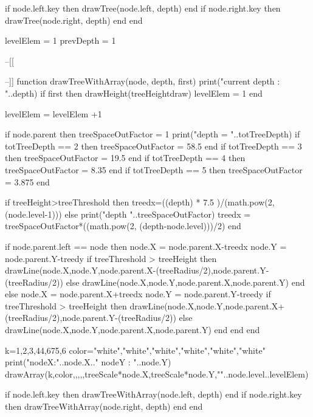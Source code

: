 	if node.left.key then
		drawTree(node.left, depth)
	end
	if node.right.key then
		drawTree(node.right, depth)
	end
end

levelElem = 1
prevDepth = 1

--[[

--]]
function drawTreeWithArray(node, depth, first)
	print("current depth : "..depth)
	if first then 
		drawHeight(treeHeightdraw)
		levelElem = 1
	end

	levelElem = levelElem +1

	if node.parent then
		treeSpaceOutFactor = 1	
		print("depth = "..totTreeDepth)
		if totTreeDepth == 2 then 
			treeSpaceOutFactor = 58.5			
		end
		if totTreeDepth == 3 then 
			treeSpaceOutFactor = 19.5			
		end
		if totTreeDepth == 4 then 
			treeSpaceOutFactor = 8.35			
		end
		if totTreeDepth == 5 then 
			treeSpaceOutFactor = 3.875			
		end

		if treeHeight>treeThreshold then
			treedx=((depth) * 7.5 )/(math.pow(2,(node.level-1)))
		else
			print("depth "..treeSpaceOutFactor)
			treedx = treeSpaceOutFactor*((math.pow(2, (depth-node.level)))/2)
		end

		if node.parent.left == node then		
			node.X = node.parent.X-treedx
			node.Y = node.parent.Y-treedy
			if treeThreshold > treeHeight then
				drawLine(node.X,node.Y,node.parent.X-(treeRadius/2),node.parent.Y-(treeRadius/2))
			else
				drawLine(node.X,node.Y,node.parent.X,node.parent.Y)
			end
		else
			node.X = node.parent.X+treedx
			node.Y = node.parent.Y-treedy
			if treeThreshold > treeHeight then
				drawLine(node.X,node.Y,node.parent.X+(treeRadius/2),node.parent.Y-(treeRadius/2))
			else
				drawLine(node.X,node.Y,node.parent.X,node.parent.Y)
			end
		end
	end

	k={1,2,3,44,675,6}
	color={"white","white","white","white","white","white"}
	print("nodeX:"..node.X.."  nodeY : "..node.Y)	
	drawArray(k,color,{},{},{},{},treeScale*node.X,treeScale*node.Y,""..node.level..levelElem)

	if node.left.key then
		drawTreeWithArray(node.left, depth)
	end
	if node.right.key then
		drawTreeWithArray(node.right, depth)
	end
end

\stopluacode
